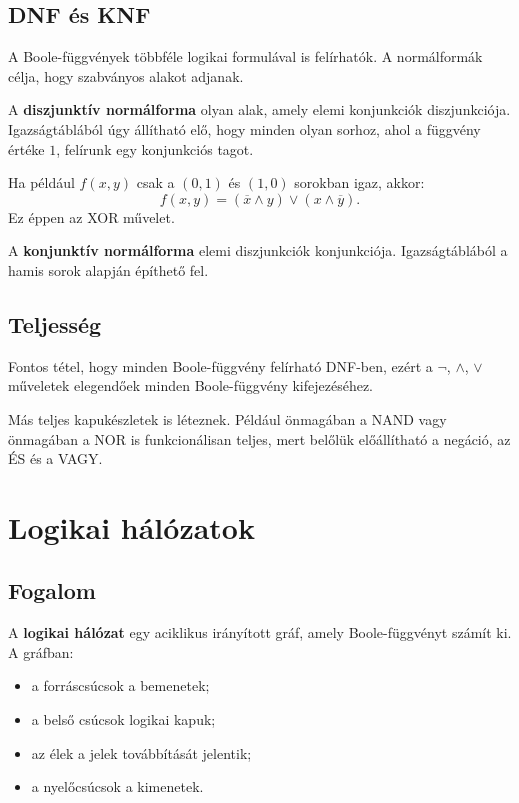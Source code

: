 \subsection{DNF és KNF}

A Boole-függvények többféle logikai formulával is felírhatók. A normálformák célja, hogy szabványos alakot adjanak.

\begin{center}

\end{center}

A \textbf{diszjunktív normálforma} olyan alak, amely elemi konjunkciók diszjunkciója. Igazságtáblából úgy állítható elő, hogy minden olyan sorhoz, ahol a függvény értéke $1$, felírunk egy konjunkciós tagot.

Ha például $f(x,y)$ csak a $(0,1)$ és $(1,0)$ sorokban igaz, akkor:
\[
  f(x,y)=(\overline{x}\wedge y)\vee(x\wedge\overline{y}).
\]
Ez éppen az XOR művelet.

A \textbf{konjunktív normálforma} elemi diszjunkciók konjunkciója. Igazságtáblából a hamis sorok alapján építhető fel.

\subsection{Teljesség}

Fontos tétel, hogy minden Boole-függvény felírható DNF-ben, ezért a $\neg$, $\wedge$, $\vee$ műveletek elegendőek minden Boole-függvény kifejezéséhez.

Más teljes kapukészletek is léteznek. Például önmagában a NAND vagy önmagában a NOR is funkcionálisan teljes, mert belőlük előállítható a negáció, az ÉS és a VAGY.

\section{Logikai hálózatok}

\subsection{Fogalom}

A \textbf{logikai hálózat} egy aciklikus irányított gráf, amely Boole-függvényt számít ki. A gráfban:

\begin{itemize}
  \item a forráscsúcsok a bemenetek;
  \item a belső csúcsok logikai kapuk;
  \item az élek a jelek továbbítását jelentik;
  \item a nyelőcsúcsok a kimenetek.
\end{itemize}

